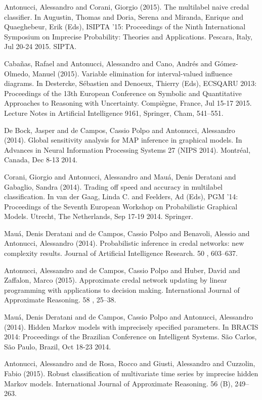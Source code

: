 \begin{cventries}
\begin{cvitems}
\item Antonucci, Alessandro and Corani, Giorgio (2015).   The multilabel naive credal classifier.   In Augustin, Thomas and Doria, Serena and Miranda, Enrique and Quaeghebeur, Erik (Eds), ISIPTA ’15: Proceedings of the Ninth International Symposium on Imprecise Probability: Theories and Applications.   Pescara, Italy,   Jul 20-24 2015.   SIPTA.
\item Cabañas, Rafael and Antonucci, Alessandro and Cano, Andrés and Gómez-Olmedo, Manuel (2015).   Variable elimination for interval-valued influence diagrams.   In Destercke, Sébastien and Denoeux, Thierry (Eds), ECSQARU 2013: Proceedings of the 13th European Conference on Symbolic and Quantitative Approaches to Reasoning with Uncertainty.   Compiègne, France, Jul 15-17 2015.   Lecture Notes in Artificial Intelligence 9161, Springer, Cham, 541–551.
\item De Bock, Jasper and de Campos, Cassio Polpo and Antonucci, Alessandro (2014).   Global sensitivity analysis for MAP inference in graphical models.   In Advances in Neural Information Processing Systems 27 (NIPS 2014).   Montréal, Canada,   Dec 8-13 2014.
\item Corani, Giorgio and Antonucci, Alessandro and Mauá, Denis Deratani and Gabaglio, Sandra (2014).   Trading off speed and accuracy in multilabel classification.   In van der Gaag, Linda C. and Feelders, Ad (Eds), PGM ’14: Proceedings of the Seventh European Workshop on Probabilistic Graphical Models.   Utrecht, The Netherlands,   Sep 17-19 2014.   Springer.
\item Mauá, Denis Deratani and de Campos, Cassio Polpo and Benavoli, Alessio and Antonucci, Alessandro (2014).   Probabilistic inference in credal networks: new complexity results.   Journal of Artificial Intelligence Research. 50 , 603–637.
\item Antonucci, Alessandro and de Campos, Cassio Polpo and Huber, David and Zaffalon, Marco (2015).   Approximate credal network updating by linear programming with applications to decision making.   International Journal of Approximate Reasoning. 58 , 25–38.
\item Mauá, Denis Deratani and de Campos, Cassio Polpo and Antonucci, Alessandro (2014).   Hidden Markov models with imprecisely specified parameters.   In BRACIS 2014: Proceedings of the Brazilian Conference on Intelligent Systems.   São Carlos, São Paulo, Brazil,   Oct 18-23 2014.
\item Antonucci, Alessandro and de Rosa, Rocco and Giusti, Alessandro and Cuzzolin, Fabio (2015).   Robust classification of multivariate time series by imprecise hidden Markov models.   International Journal of Approximate Reasoning. 56 (B), 249–263.

\end{cvitems}
\end{cventries}
